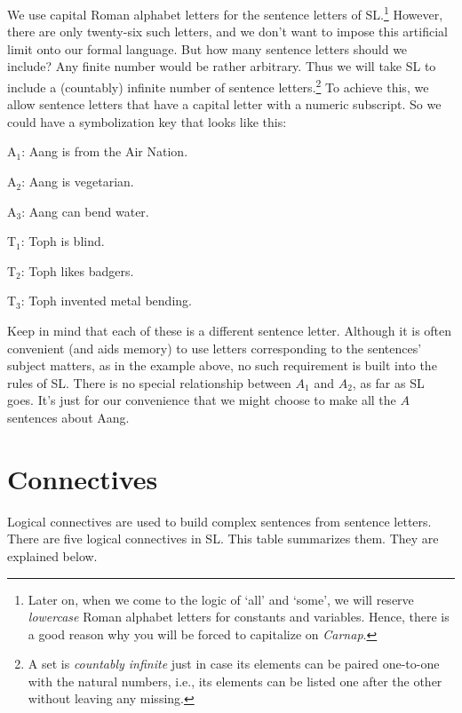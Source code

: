 We use capital Roman alphabet letters for the sentence letters of SL.\footnote{Later on, when we come to the logic of `all' and `some', we will reserve \textit{lowercase} Roman alphabet letters for constants and variables. Hence, there is a good reason why you will be forced to capitalize on \textit{Carnap}.} 
However, there are only twenty-six such letters, and we don't want to impose this artificial limit onto our formal language.
But how many sentence letters should we include?
Any finite number would be rather arbitrary.
Thus we will take SL to include a (countably) infinite number of sentence letters.\footnote{A set is \textit{countably infinite} just in case its elements can be paired one-to-one with the natural numbers, i.e., its elements can be listed one after the other without leaving any missing.}
To achieve this, we allow sentence letters that have a capital letter with a numeric subscript.
So we could have a symbolization key that looks like this:

\begin{ekey}
\item[A$_1$:] Aang is from the Air Nation.
\item[A$_2$:] Aang is vegetarian.
\item[A$_3$:] Aang can bend water.
\item[T$_1$:] Toph is blind.
\item[T$_2$:] Toph likes badgers.
\item[T$_3$:] Toph invented metal bending.
\end{ekey}

Keep in mind that each of these is a different sentence letter.
Although it is often convenient (and aids memory) to use letters corresponding to the sentences' subject matters, as in the example above, no such requirement is built into the rules of SL.
There is no special relationship between $A_{1}$ and $A_{2}$, as far as SL goes.
It's just for our convenience that we might choose to make all the $A$ sentences about Aang.




\section{Connectives}

Logical connectives are used to build complex sentences from sentence letters.
There are five logical connectives in SL.
This table summarizes them.
They are explained below.


